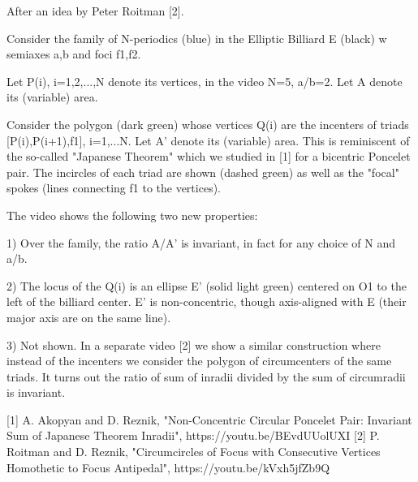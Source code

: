 After an idea by Peter Roitman [2].

Consider the family of N-periodics (blue) in the Elliptic Billiard E (black) w semiaxes a,b and foci f1,f2.

Let P(i), i=1,2,...,N denote its vertices, in the video N=5, a/b=2. Let A denote its (variable) area.

Consider the polygon (dark green) whose vertices Q(i) are the incenters of triads [P(i),P(i+1),f1], i=1,...N. Let A' denote its (variable) area. This is reminiscent of the so-called "Japanese Theorem" which we studied in [1] for a bicentric Poncelet pair. The incircles of each triad are shown (dashed green) as well as the "focal" spokes (lines connecting f1 to the vertices).

The video shows the following two new properties:

1) Over the family, the ratio A/A' is invariant, in fact for any choice of N and a/b.

2) The locus of the Q(i) is an ellipse E' (solid light green) centered on O1 to the left of the billiard center. E' is non-concentric, though  axis-aligned with E (their major axis are on the same line).

3) Not shown. In a separate video [2] we show a similar construction where instead of the incenters we consider the polygon of circumcenters of the same triads. It turns out the ratio of sum of inradii divided by the sum of circumradii is invariant.

[1] A. Akopyan and D. Reznik, "Non-Concentric Circular Poncelet Pair: Invariant Sum of Japanese Theorem Inradii", https://youtu.be/BEvdUUolUXI
[2] P. Roitman and D. Reznik, "Circumcircles of Focus with Consecutive Vertices Homothetic to Focus Antipedal", https://youtu.be/kVxh5jfZb9Q